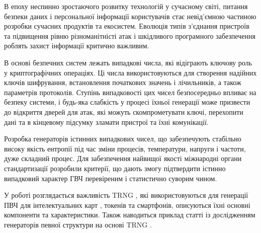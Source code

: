 В епоху неспинно зростаючого розвитку технологій у сучасному світі, питання безпеки даних і персональної інформації користувачів стає невід'ємною частиною розробки сучасних продуктів та екосистем. Еволюція типів з'єднання пристроїв та підвищення рівню різноманітністі атак і шкідливого програмного забезпечення роблять захист інформації критично важливим.

В основі безпечних систем лежать випадкові числа, які відіграють ключову роль у криптографічних операціях. Ці числа використовуються для створення надійних ключів шифрування, встановлення початкових значень і лічильників, а також параметрів протоколів. Ступінь випадковості цих чисел безпосередньо впливає на безпеку системи, і будь-яка слабкість у процесі їхньої генерації може призвести до відкриття дверей для атак, які можуть скомпрометувати ключі, перехопити дані та в кінцевому підсумку зламати пристрої та їхні комунікації.

Розробка генераторів істинних випадкових чисел, що забезпечують стабільно високу якість ентропії під час зміни процесів, температури, напруги і частоти, дуже складний процес. Для забезпечення найвищої якості міжнародні органи стандартизації розробили критерії, що дають змогу підтвердити істинно випадковий характер ГВЧ перевіреним і статистично суворим чином.

У роботі розглядається важливість TRNG \cite{synopsys2019true}, які використовуються для генерації ПВЧ для інтелектуальних карт \cite{pannetrat2015true}, токенів та смартфонів, описуються їхні основні компоненти та характеристики. Також наводиться приклад статті із дослідженням генераторів певної структури на основі TRNG \cite{pseudorandomSmartCards}.